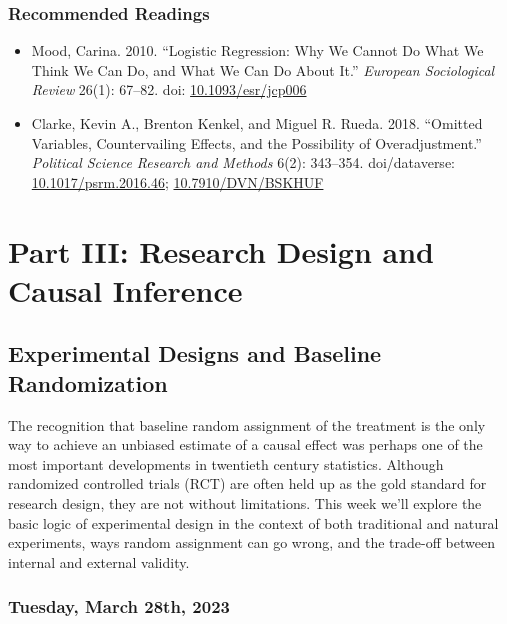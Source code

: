 \documentclass[12pt,]{article}
\begin{document}
\hypertarget{recommended-readings-6}{%
\subsubsection{Recommended Readings}\label{recommended-readings-6}}

\begin{itemize}
\item
  Mood, Carina. 2010. ``Logistic Regression: Why We Cannot Do What We
  Think We Can Do, and What We Can Do About It.'' \emph{European
  Sociological Review} 26(1): 67--82. doi:
  \href{https://doi.org/10.1093/esr/jcp006}{10.1093/esr/jcp006}
\item
  Clarke, Kevin A., Brenton Kenkel, and Miguel R. Rueda. 2018. ``Omitted
  Variables, Countervailing Effects, and the Possibility of
  Overadjustment.'' \emph{Political Science Research and Methods} 6(2):
  343--354. doi/dataverse:
  \href{https://doi.org/10.1017/psrm.2016.46}{10.1017/psrm.2016.46};
  \href{https://doi.org/10.7910/DVN/BSKHUF}{10.7910/DVN/BSKHUF}
\end{itemize}

\hypertarget{part-iii-research-design-and-causal-inference}{%
\section{Part III: Research Design and Causal
Inference}\label{part-iii-research-design-and-causal-inference}}

\hypertarget{experimental-designs-and-baseline-randomization}{%
\subsection{Experimental Designs and Baseline
Randomization}\label{experimental-designs-and-baseline-randomization}}

\noindent The recognition that baseline random assignment of the
treatment is the only way to achieve an unbiased estimate of a causal
effect was perhaps one of the most important developments in twentieth
century statistics. Although randomized controlled trials (RCT) are
often held up as the gold standard for research design, they are not
without limitations. This week we'll explore the basic logic of
experimental design in the context of both traditional and natural
experiments, ways random assignment can go wrong, and the trade-off
between internal and external validity.

\hypertarget{tuesday-march-28th-2023}{%
\subsubsection{Tuesday, March 28th,
2023}\label{tuesday-march-28th-2023}}
\end{document}
